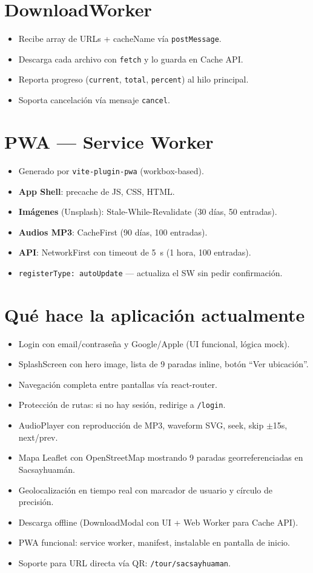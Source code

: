 \documentclass[11pt,a4paper]{article}
\begin{document}
\section{DownloadWorker}
\begin{itemize}[nosep]
  \item Recibe array de URLs + cacheName vía \texttt{postMessage}.
  \item Descarga cada archivo con \texttt{fetch} y lo guarda en Cache API.
  \item Reporta progreso (\texttt{current}, \texttt{total}, \texttt{percent}) al hilo principal.
  \item Soporta cancelación vía mensaje \texttt{cancel}.
\end{itemize}

\section{PWA — Service Worker}
\begin{itemize}[nosep]
  \item Generado por \texttt{vite-plugin-pwa} (workbox-based).
  \item \textbf{App Shell}: precache de JS, CSS, HTML.
  \item \textbf{Imágenes} (Unsplash): Stale-While-Revalidate (30 días, 50 entradas).
  \item \textbf{Audios MP3}: CacheFirst (90 días, 100 entradas).
  \item \textbf{API}: NetworkFirst con timeout de 5~s (1 hora, 100 entradas).
  \item \texttt{registerType: autoUpdate} — actualiza el SW sin pedir confirmación.
\end{itemize}

\section{Qué hace la aplicación actualmente}
\begin{itemize}[nosep]
  \item Login con email/contraseña y Google/Apple (UI funcional, lógica mock).
  \item SplashScreen con hero image, lista de 9 paradas inline, botón ``Ver ubicación''.
  \item Navegación completa entre pantallas vía react-router.
  \item Protección de rutas: si no hay sesión, redirige a \texttt{/login}.
  \item AudioPlayer con reproducción de MP3, waveform SVG, seek, skip $\pm$15s, next/prev.
  \item Mapa Leaflet con OpenStreetMap mostrando 9 paradas georreferenciadas en Sacsayhuamán.
  \item Geolocalización en tiempo real con marcador de usuario y círculo de precisión.
  \item Descarga offline (DownloadModal con UI + Web Worker para Cache API).
  \item PWA funcional: service worker, manifest, instalable en pantalla de inicio.
  \item Soporte para URL directa vía QR: \texttt{/tour/sacsayhuaman}.
\end{itemize}
\end{document}
